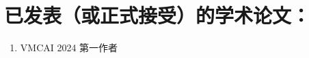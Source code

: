 



\section*{已发表（或正式接受）的学术论文：}

{
\setlist[enumerate]{}%
\begin{enumerate}[nosep]
    \item VMCAI 2024 第一作者
\end{enumerate}
}





\cleardoublepage[plain]%

